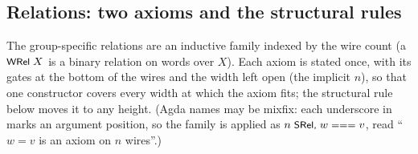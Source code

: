 \subsection{Relations: two axioms and the structural rules}

The group-specific relations are an inductive family indexed by the wire
count (a $\mbox{\textsf{\small WRel}}\;X$ is a binary relation on words over $X$).  Each
axiom is stated once, with its gates at the bottom of the
wires and the width left open (the implicit $n$), so that one constructor
covers every width at which the axiom fits; the structural rule
 below moves it to any height.  (Agda names may be mixfix:
each underscore in  marks an argument
position, so the family is applied as $n\;\aid{SRel,}\;w \aidrel{===}
v$, read ``$w = v$ is an axiom on $n$ wires''.)

